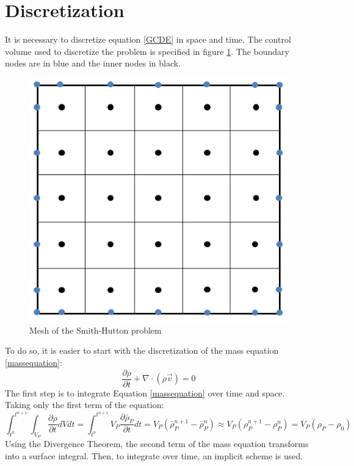 \section{Discretization}
It is necessary to discretize equation \ref{GCDE} in space and time. The control volume used to discretize the problem is specified in figure \ref{SHmesh}. The boundary nodes are in blue and the inner nodes in black.
\begin{figure}
	\includegraphics[scale=0.8]{SmithHutton/mesh}
	\caption{Mesh of the Smith-Hutton problem}
	\label{SHmesh}
\end{figure}
To do so, it is easier to start with the discretization of the mass equation \ref{massequation}:
\begin{equation}
\frac{\partial\rho}{\partial t}+\nabla\cdot\left(\rho\vec{v}\right)=0
\label{massequation}
\end{equation}
The first step is to integrate Equation \ref{massequation} over time and space. Taking only the first term of the equation:
\begin{equation}
\int_{t^{n}}^{t^{n+1}}\int_{V_{P}}^{}\frac{\partial\rho}{\partial t}dVdt=\int_{t^{n}}^{t^{n+1}}V_{P}\frac{\partial\bar{\rho}_{P}}{\partial t}dt=V_{P}\left(\bar{\rho}_{P}^{n+1}-\bar{\rho}_{P}^{n}\right)\approx V_{P}\left(\rho_{P}^{n+1}-\rho_{P}^{n}\right)=V_{P}\left(\rho_{P}-\rho_{0}\right)
\end{equation}
Using the Divergence Theorem, the second term of the mass equation transforms into a surface integral. Then, to integrate over time, an implicit scheme is used.
